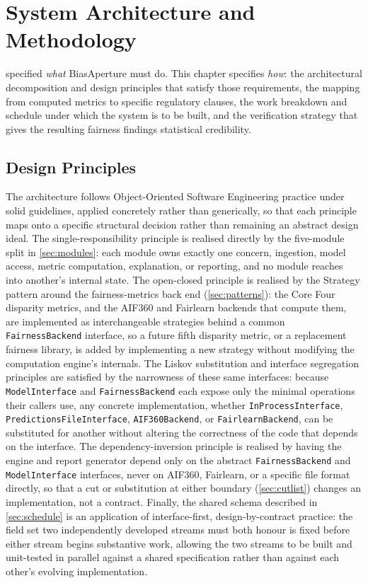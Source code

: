 \chapter{System Architecture and Methodology}
\label{chap:methodology}

 specified \emph{what} BiasAperture must do. This chapter specifies \emph{how}: the architectural decomposition and design principles that satisfy those requirements, the mapping from computed metrics to specific regulatory clauses, the work breakdown and schedule under which the system is to be built, and the verification strategy that gives the resulting fairness findings statistical credibility.

\section{Design Principles}

The architecture follows Object-Oriented Software Engineering practice under \gls{solid} guidelines, applied concretely rather than generically, so that each principle maps onto a specific structural decision rather than remaining an abstract design ideal. The single-responsibility principle is realised directly by the five-module split in \cref{sec:modules}: each module owns exactly one concern, ingestion, model access, metric computation, explanation, or reporting, and no module reaches into another's internal state. The open-closed principle is realised by the Strategy pattern around the fairness-metrics back end (\cref{sec:patterns}): the Core Four disparity metrics, and the AIF360 and Fairlearn backends that compute them, are implemented as interchangeable strategies behind a common \texttt{FairnessBackend} interface, so a future fifth disparity metric, or a replacement fairness library, is added by implementing a new strategy without modifying the computation engine's internals. The Liskov substitution and interface segregation principles are satisfied by the narrowness of these same interfaces: because \texttt{ModelInterface} and \texttt{FairnessBackend} each expose only the minimal operations their callers use, any concrete implementation, whether \texttt{InProcessInterface}, \texttt{PredictionsFileInterface}, \texttt{AIF360Backend}, or \texttt{FairlearnBackend}, can be substituted for another without altering the correctness of the code that depends on the interface. The dependency-inversion principle is realised by having the engine and report generator depend only on the abstract \texttt{FairnessBackend} and \texttt{ModelInterface} interfaces, never on AIF360, Fairlearn, or a specific file format directly, so that a cut or substitution at either boundary (\cref{sec:cutlist}) changes an implementation, not a contract. Finally, the shared schema described in \cref{sec:schedule} is an application of interface-first, design-by-contract practice: the field set two independently developed streams must both honour is fixed before either stream begins substantive work, allowing the two streams to be built and unit-tested in parallel against a shared specification rather than against each other's evolving implementation.
\clearpage

